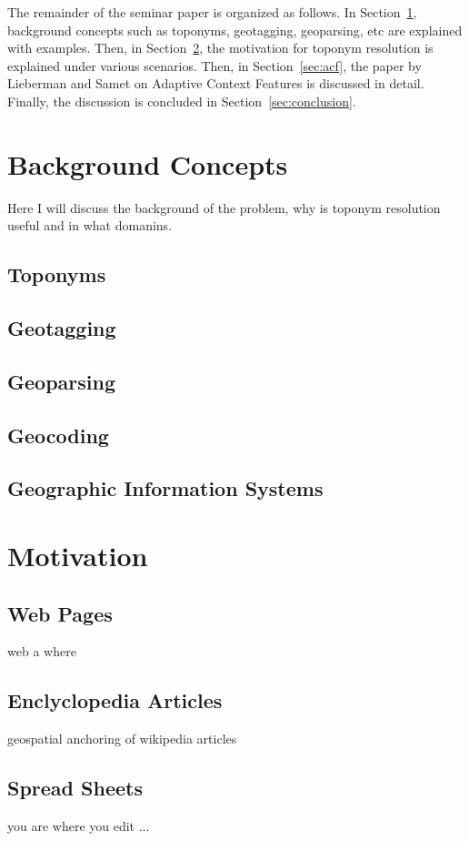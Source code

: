 \documentclass[
     11pt,         %
     a4paper,      %
     oneside,
     ]{article}
\begin{document}
The remainder of the seminar paper is organized as follows. In Section~\ref{sec:background_concepts}, background concepts such as toponyms, geotagging, geoparsing, etc are explained with examples.
Then, in Section~\ref{sec:sections}, the motivation for toponym resolution is explained under various scenarios. Then, in Section~\ref{sec:acf}, the paper by Lieberman and Samet \cite{Lieberman12adaptivecontext} on Adaptive Context Features is discussed in detail. Finally, the discussion is concluded in Section~\ref{sec:conclusion}.

\section{Background Concepts}\label{sec:background_concepts}
Here I will discuss the background of the problem, why is toponym resolution useful and in what domanins.
\subsection{Toponyms}
\subsection{Geotagging}
\subsection{Geoparsing}
\subsection{Geocoding}
\subsection{Geographic Information Systems}

\section{Motivation}\label{sec:sections}
\subsection{Web Pages} web a where
\subsection{Enclyclopedia Articles} geospatial anchoring of wikipedia articles
\subsection{Spread Sheets} you are where you edit ...
\end{document}
